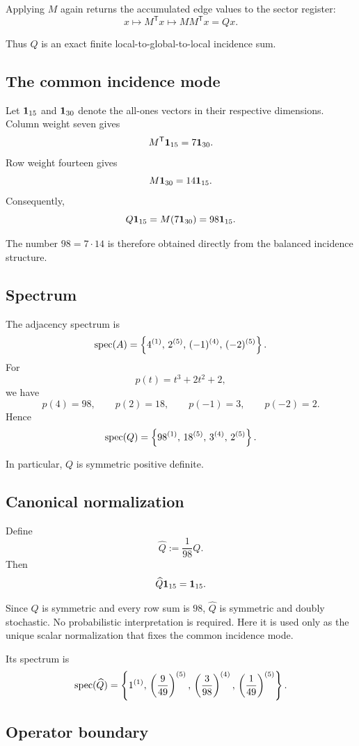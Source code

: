 Applying \(M\) again returns the accumulated edge values to the
sector register:
\[
x
\longmapsto
M^{\mathsf T}x
\longmapsto
MM^{\mathsf T}x
=
Qx.
\]

Thus \(Q\) is an exact finite local-to-global-to-local incidence sum.

\subsection{The common incidence mode}

Let \(\mathbf{1}_{15}\) and \(\mathbf{1}_{30}\) denote the all-ones vectors in
their respective dimensions.  Column weight seven gives
\[
M^{\mathsf T}\mathbf{1}_{15}
=
7\mathbf{1}_{30}.
\]
Row weight fourteen gives
\[
M\mathbf{1}_{30}
=
14\mathbf{1}_{15}.
\]
Consequently,
\[
Q\mathbf{1}_{15}
=
M(7\mathbf{1}_{30})
=
98\mathbf{1}_{15}.
\]

The number \(98=7\cdot14\) is therefore obtained directly from the
balanced incidence structure.

\subsection{Spectrum}

The adjacency spectrum is
\[
\operatorname{spec}(A)
=
\left\{
4^{(1)},\,
2^{(5)},\,
(-1)^{(4)},\,
(-2)^{(5)}
\right\}.
\]
For
\[
p(t)=t^3+2t^2+2,
\]
we have
\[
p(4)=98,\qquad
p(2)=18,\qquad
p(-1)=3,\qquad
p(-2)=2.
\]
Hence
\[
\operatorname{spec}(Q)
=
\left\{
98^{(1)},\,
18^{(5)},\,
3^{(4)},\,
2^{(5)}
\right\}.
\]

In particular, \(Q\) is symmetric positive definite.

\subsection{Canonical normalization}

Define
\[
\widehat{Q}
:=
\frac{1}{98}Q.
\]
Then
\[
\widehat{Q}\mathbf{1}_{15}
=
\mathbf{1}_{15}.
\]

Since \(Q\) is symmetric and every row sum is \(98\),
\(\widehat{Q}\) is symmetric and doubly stochastic.  No probabilistic
interpretation is required.  Here it is used only as the unique scalar
normalization that fixes the common incidence mode.

Its spectrum is
\[
\operatorname{spec}(\widehat{Q})
=
\left\{
1^{(1)},\,
\left(\frac{9}{49}\right)^{(5)},\,
\left(\frac{3}{98}\right)^{(4)},\,
\left(\frac{1}{49}\right)^{(5)}
\right\}.
\]

\subsection{Operator boundary}


